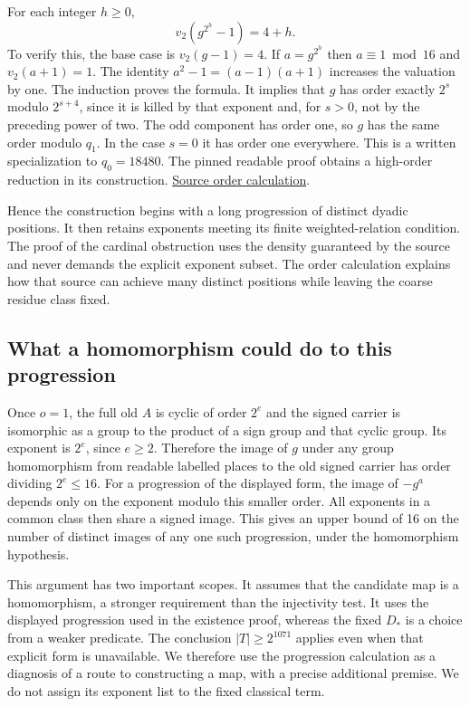 \documentclass[12pt,letterpaper]{article}
\newcommand{\readable}[3]{\href{https://github.com/leanprover-community/riemann-hypothesis/blob/e063a923620ee7787b4a1270421478645bf66bdb/src/#1\#L#2}{#3}}
\begin{document}
For each integer $h\ge0$,
\[
                        v_2(g^{2^h}-1)=4+h .
\]
To verify this, the base case is $v_2(g-1)=4$. If $a=g^{2^h}$ then $a\equiv1\bmod16$ and $v_2(a+1)=1$. The identity $a^2-1=(a-1)(a+1)$ increases the valuation by one. The induction proves the formula. It implies that $g$ has order exactly $2^s$ modulo $2^{s+4}$, since it is killed by that exponent and, for $s>0$, not by the preceding power of two. The odd component has order one, so $g$ has the same order modulo $q_1$. In the case $s=0$ it has order one everywhere. This is a written specialization to $q_0=18480$. The pinned readable proof obtains a high-order reduction in its construction. \readable{New/Reduction/Data/Existence.lean}{119}{Source order calculation}.

Hence the construction begins with a long progression of distinct dyadic positions. It then retains exponents meeting its finite weighted-relation condition. The proof of the cardinal obstruction uses the density guaranteed by the source and never demands the explicit exponent subset. The order calculation explains how that source can achieve many distinct positions while leaving the coarse residue class fixed.

\subsection{What a homomorphism could do to this progression}
Once $o=1$, the full old $A$ is cyclic of order $2^e$ and the signed carrier is isomorphic as a group to the product of a sign group and that cyclic group. Its exponent is $2^e$, since $e\ge2$. Therefore the image of $g$ under any group homomorphism from readable labelled places to the old signed carrier has order dividing $2^e\le16$. For a progression of the displayed form, the image of $-g^a$ depends only on the exponent modulo this smaller order. All exponents in a common class then share a signed image. This gives an upper bound of 16 on the number of distinct images of any one such progression, under the homomorphism hypothesis.

This argument has two important scopes. It assumes that the candidate map is a homomorphism, a stronger requirement than the injectivity test. It uses the displayed progression used in the existence proof, whereas the fixed $D_*$ is a choice from a weaker predicate. The conclusion $|T|\ge2^{1071}$ applies even when that explicit form is unavailable. We therefore use the progression calculation as a diagnosis of a route to constructing a map, with a precise additional premise. We do not assign its exponent list to the fixed classical term.
\end{document}

